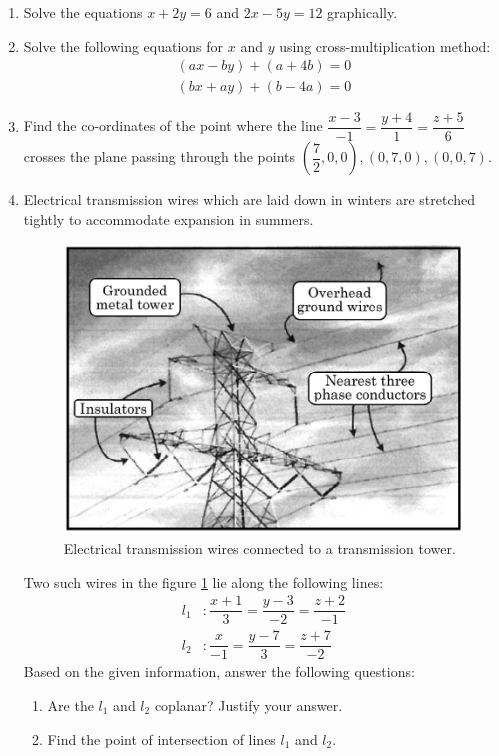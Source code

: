 \begin{enumerate}[label=\thesection.\arabic*.,ref=\thesection.\theenumi]

\item Solve the equations $x+2y=6$ and $2x-5y=12$ graphically.	

	\item Solve the following equations for $x$ and $y$ using cross-multiplication method:
		\begin{align}
			(ax-by)+(a+4b)=0\\(bx+ay)+(b-4a)=0
		\end{align}

	\item Find the co-ordinates of the point where the line $\dfrac{x-3}{-1}=\dfrac{y+4}{1}=\dfrac{z+5}{6}$ crosses the plane passing through the points $\left(\dfrac{7}{2},0,0\right),(0,7,0),(0,0,7)$.

	\item Electrical transmission wires which are laid down in winters are stretched tightly to accommodate expansion in summers.
		\begin{figure}[H]
			\centering
			\includegraphics[width=\columnwidth]{figs/txn}
			\caption{Electrical transmission wires connected to a transmission tower.}
			\label{fig:txn1}
		\end{figure}
		Two such wires in the figure \ref{fig:txn1} lie along the following lines:
		\begin{align}
			l_1 &: \dfrac{x+1}{3}=\dfrac{y-3}{-2}=\dfrac{z+2}{-1}\\
			l_2 &: \dfrac{x}{-1}=\dfrac{y-7}{3}=\dfrac{z+7}{-2}
		\end{align}
		Based on the given information, answer the following questions:
		\begin{enumerate}
			\item	Are the $l_1$ and $l_2$ coplanar? Justify your answer.
			\item    Find the point of intersection of lines $l_1$ and $l_2$.
		\end{enumerate}


\end{enumerate}

